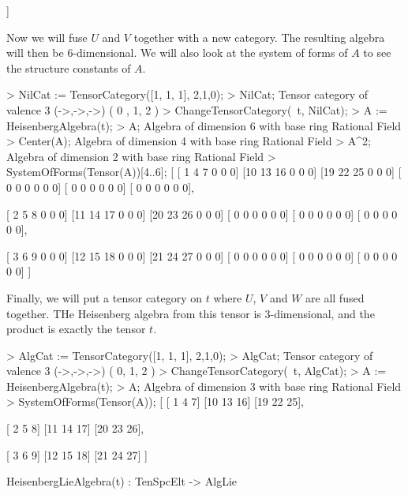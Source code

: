 \begin{example}[CraftingAlgebras]
\begin{code}
    [ 0  0  0  3  6  9  0  0  0]
    [ 0  0  0 12 15 18  0  0  0]
    [ 0  0  0 21 24 27  0  0  0]
    [ 0  0  0  0  0  0  0  0  0]
    [ 0  0  0  0  0  0  0  0  0]
    [ 0  0  0  0  0  0  0  0  0]
    [ 0  0  0  0  0  0  0  0  0]
    [ 0  0  0  0  0  0  0  0  0]
    [ 0  0  0  0  0  0  0  0  0]
]
\end{code}

Now we will fuse $U$ and $V$ together with a new category. 
The resulting algebra will then be 6-dimensional.
We will also look at the system of forms of $A$ to see the structure constants of $A$. 
\begin{code}
> NilCat := TensorCategory([1, 1, 1], {{2,1},{0}});
> NilCat;
Tensor category of valence 3 (->,->,->) ({ 0 },{ 1, 2 })
> ChangeTensorCategory(~t, NilCat);
> A := HeisenbergAlgebra(t);
> A;
Algebra of dimension 6 with base ring Rational Field
> Center(A);
Algebra of dimension 4 with base ring Rational Field
> A^2;
Algebra of dimension 2 with base ring Rational Field
> SystemOfForms(Tensor(A))[4..6];
[
    [ 1  4  7  0  0  0]
    [10 13 16  0  0  0]
    [19 22 25  0  0  0]
    [ 0  0  0  0  0  0]
    [ 0  0  0  0  0  0]
    [ 0  0  0  0  0  0],

    [ 2  5  8  0  0  0]
    [11 14 17  0  0  0]
    [20 23 26  0  0  0]
    [ 0  0  0  0  0  0]
    [ 0  0  0  0  0  0]
    [ 0  0  0  0  0  0],

    [ 3  6  9  0  0  0]
    [12 15 18  0  0  0]
    [21 24 27  0  0  0]
    [ 0  0  0  0  0  0]
    [ 0  0  0  0  0  0]
    [ 0  0  0  0  0  0]
]
\end{code}

Finally, we will put a tensor category on $t$ where $U$, $V$ and $W$ are all fused together. 
THe Heisenberg algebra from this tensor is 3-dimensional, and the product is exactly the tensor $t$.
\begin{code}
> AlgCat := TensorCategory([1, 1, 1], {{2,1,0}});
> AlgCat;
Tensor category of valence 3 (->,->,->) ({ 0, 1, 2 })
> ChangeTensorCategory(~t, AlgCat);
> A := HeisenbergAlgebra(t);
> A;
Algebra of dimension 3 with base ring Rational Field
> SystemOfForms(Tensor(A));
[
    [ 1  4  7]
    [10 13 16]
    [19 22 25],

    [ 2  5  8]
    [11 14 17]
    [20 23 26],

    [ 3  6  9]
    [12 15 18]
    [21 24 27]
]
\end{code}
\end{example}

\begin{intrinsics}
HeisenbergLieAlgebra(t) : TenSpcElt -> AlgLie
\end{intrinsics}

